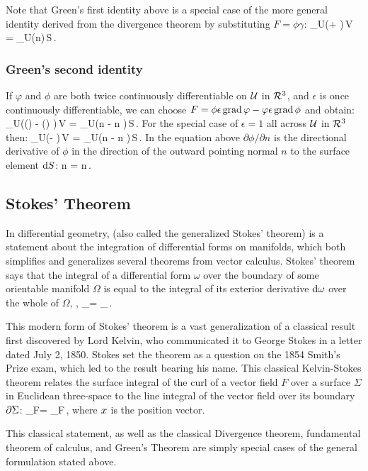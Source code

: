 Note that Green's first identity above is a special case of the more general identity derived from the divergence theorem by substituting $F = \phi\gamma$:
\beq
\int_{\region U}\left(\phi\grad\iprod\gamma + \gamma\iprod\grad\phi \right)\,\dx\region V 
    = \oint_{\bound\region U}\phi(\gamma\iprod n)\,\dx S\,.
\eeq


\subsubsection{Green's second identity}
If $\varphi$ and $\phi$ are both twice continuously differentiable on $\mathcal{U}$ in $\mathcal{R}^{3}$, and $\epsilon$ is once continuously differentiable, we can choose $F = \phi\epsilon\operatorname{grad}\varphi - \varphi\epsilon\operatorname{grad}\phi$ and obtain:
\beq
\int_{\region U}\left(\phi\grad\iprod(\epsilon\grad\varphi) 
                    - \varphi\grad\iprod(\epsilon\grad\phi)
                \right)\,\dx\region V
= \oint_{\bound\region U}\epsilon\left(\phi\xpd\varphi n - \varphi\xpd\phi n \right)\,\dx S\,.                
\eeq
For the special case of $\epsilon = 1$ all across $\mathcal{U}$ in $\mathcal{R}^{3}$ then:
\beq
\int_{\region U}\left(\phi\lder\varphi - \varphi\lder\phi\right)\,\dx\region V
= \oint_{\bound\region U}\left(\phi\xpd\varphi n - \varphi\xpd\phi n \right)\,\dx S\,. 
\eeq
In the equation above $\partial\phi/\partial n$ is the directional derivative of $\phi$ in the direction of the outward pointing normal $n$ to the surface element $\text{d} S$:
\beq
\xpd\phi n = \grad\phi\iprod n\,.
\eeq


\subsection{Stokes' Theorem}
In differential geometry,  (also called the generalized Stokes' theorem) is a statement about the integration of differential forms on manifolds, which both simplifies and generalizes several theorems from vector calculus. Stokes' theorem says that the integral of a differential form $\omega$ over the boundary of some orientable manifold $\Omega$ is equal to the integral of its exterior derivative $\text{d}\omega$ over the whole of $\Omega$, \ie,
\beq
\int_{\bound\Omega}\omega = \int_{\Omega}\dx\omega\,.
\eeq

This modern form of Stokes' theorem is a vast generalization of a classical result first discovered by Lord Kelvin, who communicated it to George Stokes in a letter dated July 2, 1850. Stokes set the theorem as a question on the 1854 Smith's Prize exam, which led to the result bearing his name. This classical Kelvin-Stokes theorem relates the surface integral of the curl of a vector field $F$ over a surface $\Sigma$ in Euclidean three-space to the line integral of the vector field over its boundary $\partial\Sigma$:
\beq
\iint_{\Sigma}\gder\cprod F\iprod\dx\Sigma = \oint_{\bound\Sigma}F\iprod\dx\pvec\,,
\eeq
where $x$ is the position vector.

This classical statement, as well as the classical Divergence theorem, fundamental theorem of calculus, and Green's Theorem are simply special cases of the general formulation stated above.

